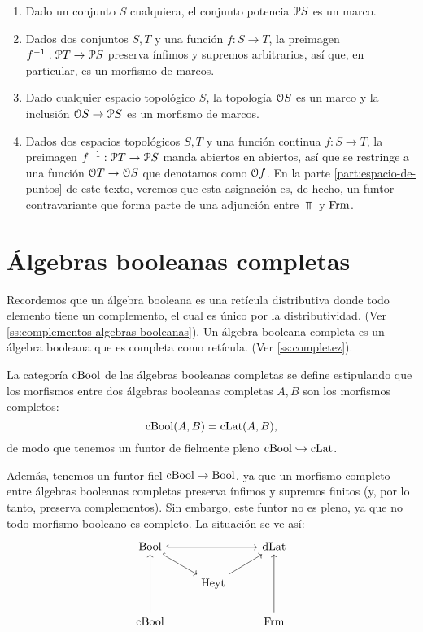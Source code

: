 \begin{exa}
  \begin{enumerate}
    \item Dado un conjunto $S$ cualquiera, el conjunto potencia
    $\cal PS$ es un marco.
    \item Dados dos conjuntos $S,T$ y una función $f:S\to T$,
    la preimagen $f^{-1}:\cal PT\to\cal PS$ preserva ínfimos
    y supremos arbitrarios, así que, en particular, es un
    morfismo de marcos.
    \item Dado cualquier espacio topológico $S$, la topología
    $\cal OS$ es un marco y la inclusión $\cal OS\to\cal PS$
    es un morfismo de marcos.
    \item Dados dos espacios topológicos $S,T$ y una función
    continua $f:S\to T$, la preimagen $f^{-1}:\cal PT\to\cal
    PS$ manda abiertos en abiertos, así que se restringe a
    una función $\cal OT\to\cal OS$ que denotamos como $\cal
    Of$.
    En la parte \ref{part:espacio-de-puntos} de este texto,
    veremos que esta asignación es, de hecho, un funtor
    contravariante que forma parte de una
    adjunción entre $\Top$ y $\Frm$.
  \end{enumerate}
\end{exa}

\section{Álgebras booleanas completas}\label{ABC}
Recordemos que un álgebra booleana es una retícula distributiva
donde todo elemento tiene un complemento, el cual es único por la
distributividad. (Ver \ref{ss:complementos-algebras-booleanas}).
Un álgebra booleana completa es un álgebra booleana que es
completa como retícula. (Ver \ref{ss:completez}).


La categoría $\CBA$ de las álgebras booleanas completas se define
estipulando que los morfismos entre dos álgebras booleanas
completas $A,B$ son los morfismos completos:
\[
  \CBA(A,B)=\CLat(A,B)
,\]
de modo que tenemos un funtor de fielmente pleno
$\CBA\rmono\CLat$.

Además, tenemos un funtor fiel $\CBA\to\Bool$, ya que un morfismo
completo entre álgebras booleanas completas preserva ínfimos y
supremos finitos (y, por lo tanto, preserva complementos).
Sin embargo, este funtor no es pleno, ya que no todo morfismo booleano
es completo.
La situación se ve así:
\begin{equation}\label{diag:cuadrado-incompleto}
\begin{tikzcd}
  \Bool \ar[dr,hook] \ar[rr,hook] &               & \DLat \\
                                  & \Heyt \ar[ur]         \\
  \CBA \ar[uu] &           & \Frm \ar[uu]
\end{tikzcd}
\end{equation}

